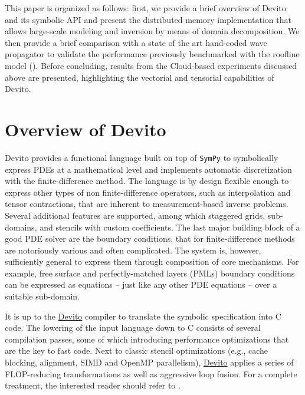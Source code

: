 \documentclass[conference]{IEEEtran}
\begin{document}
This paper is organized as follows: first, we provide a brief overview of
Devito and its symbolic API and present the distributed memory
implementation that allows large-scale modeling and inversion by means of
domain decomposition. We then provide a brief comparison with a state of
the art hand-coded wave propagator to validate the performance previously
benchmarked with the roofline model (\cite{patterson, devito-compiler,
devito-api, louboutin2016ppf}).  Before concluding, results from the
Cloud-based experiments discussed above are presented, highlighting the
vectorial and tensorial capabilities of Devito.

\section{Overview of Devito}\label{overview-of-devito}

Devito \cite{devito-api} provides a functional language built on top of
\texttt{SymPy} \cite{sympy} to symbolically express PDEs at a
mathematical level and implements automatic discretization with the
finite-difference method. The language is by design flexible enough to
express other types of non finite-difference operators, such as
interpolation and tensor contractions, that are inherent to
measurement-based inverse problems. Several additional features are
supported, among which staggered grids, sub-domains, and stencils with
custom coefficients. The last major building block of a good PDE solver
are the boundary conditions, that for finite-difference methods are
notoriously various and often complicated. The system is, however,
sufficiently general to express them through composition of core
mechanisms. For example, free surface and perfectly-matched layers
(PMLs) boundary conditions can be expressed as equations -- just like
any other PDE equations -- over a suitable sub-domain.

It is up to the \href{https://github.com/devitocodes/devito}{Devito} compiler to translate the symbolic specification
into C code. The lowering of the input language down to C consists of
several compilation passes, some of which introducing performance
optimizations that are the key to fast code. Next to classic stencil
optimizations (e.g., cache blocking, alignment, SIMD and OpenMP
parallelism), \href{https://github.com/devitocodes/devito}{Devito} applies a series of FLOP-reducing transformations as
well as aggressive loop fusion. For a complete treatment, the interested
reader should refer to \cite{devito-compiler}.
\end{document}

